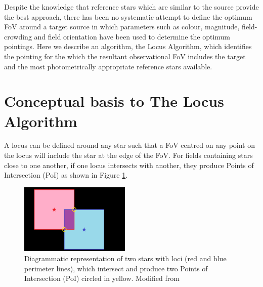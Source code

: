 \documentclass{aa}
\begin{document}
Despite the knowledge that reference stars which are similar to the source provide the best approach, there has been no systematic attempt to define the optimum FoV around a target source in which parameters such as colour, magnitude, field-crowding and field orientation have been used to determine the optimum pointings. Here we describe an algorithm, the Locus Algorithm, which identifies the pointing for the which the resultant observational FoV includes the target and the most photometrically appropriate reference stars available.

%


\section{Conceptual basis to The Locus Algorithm}
\label{conceptual-basis-to-the-locus-algorithm}

A locus can be defined around any star such that a FoV centred on any
point on the locus will include the star at the edge of the FoV. For
fields containing stars close to one another, if one locus intersects
with another, they produce Points of Intersection (PoI) as shown in Figure \ref{loci_concept}.

\begin{figure}[!htb]
\centering
\includegraphics[width=0.47\textwidth]{fig1.png}
\caption{\label{loci_concept}Diagrammatic representation of two stars with loci
(red and blue perimeter lines), which intersect and produce two Points
of Intersection (PoI) circled in yellow.  Modified from \citet{creaner2016thesis}}
\end{figure}
\end{document}

